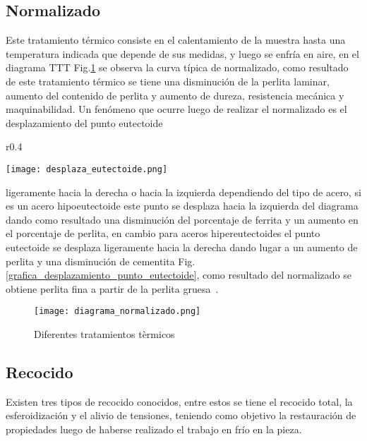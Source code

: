 \documentclass[a4paper, 9pt]{article}
\begin{document}
\subsection{Normalizado}
Este tratamiento térmico consiste en el calentamiento de la muestra hasta una temperatura indicada que depende de sus medidas, y luego se enfría en aire, en el diagrama TTT Fig.\ref{diagrama_normalizado} se observa la curva típica de normalizado, como resultado de este tratamiento térmico se tiene una disminución de la perlita laminar, aumento del contenido de perlita y aumento de dureza, resistencia mecánica y maquinabilidad. 
Un fenómeno que ocurre luego de realizar el normalizado es el desplazamiento del punto eutectoide
\begin{wrapfigure}[10]{r}{0.4\textwidth}  
\vspace{-0.8cm}
\begin{center}
    \texttt{[image: desplaza\_eutectoide.png]}
     \caption{Desplazamiento del punto eutectoide para aceros hipereutectoides y hipoeutectoides}
    \label{grafica_desplazamiento_punto_eutectoide}
\end{center}
\end{wrapfigure}
ligeramente hacia la derecha o hacia la izquierda dependiendo del tipo de acero, si es un acero hipoeutectoide este punto se desplaza hacia la izquierda del diagrama dando como resultado una disminución del porcentaje de ferrita y un aumento en el porcentaje de perlita, en cambio para aceros hipereutectoides el punto eutectoide se desplaza ligeramente hacia la derecha dando lugar a un aumento de perlita y una disminución de cementita Fig. \ref{grafica_desplazamiento_punto_eutectoide}, como resultado del normalizado se obtiene perlita fina a partir de la perlita gruesa~\cite{normalizado}.
\begin{figure}[h!] 
\centering
    \texttt{[image: diagrama\_normalizado.png]}
     \caption{Diferentes tratamientos tèrmicos}
    \label{diagrama_normalizado}
\end{figure}

\subsection{Recocido}
Existen tres tipos de recocido conocidos, entre estos se tiene el recocido total, la esferoidización y el alivio de tensiones, teniendo como objetivo la restauración de propiedades luego de haberse realizado el trabajo en frío en la pieza.
\end{document}
